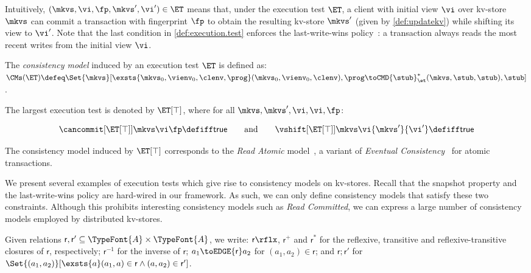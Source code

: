 Intuitively, \((\mkvs, \vi, \fp, \mkvs', \vi') \in \ET\) means that, under the execution test \(\ET\),
a client with initial view \(\vi\) over kv-store \(\mkvs\) can commit a transaction with 
fingerprint \(\fp\) to obtain the resulting kv-store \(\mkvs'\) (given
by \cref{def:updatekv}) while shifting its view
to \(\vi'\). 
Note that the last condition in \cref{def:execution.test} enforces the last-write-wins
policy~\cite{vogels:2009:ec:1435417.1435432}: 
a transaction always reads the most recent writes from the initial view \(\vi\).  

\SpaceAboveDef
\begin{definition}
\label{def:cm}
The \emph{consistency model} induced by an execution test \(\ET\) is defined as: 
\(
\CMs(\ET) \defeq 
\Set{\mkvs}[ 
\exsts{\mkvs_0,\vienv_0,\clenv,\prog}
(\mkvs_0,\vienv_0,\clenv),\prog \toCMD{\stub}_{\et}^{*} (\mkvs, \stub, \stub),\stub
]
\).
\end{definition}
\SpaceBelowDef

The largest execution test is denoted by \(\ET[\top]\), where for all \(\mkvs, \mkvs', \vi, \vi, \fp\):%

\SpaceAboveMath
\[
	\cancommit[{\ET[\top]}] \mkvs \vi \fp \defiff \mathsf{true}
	\qquad  \text{and} \qquad 
	\vshift[{\ET[\top]}] \mkvs \vi {\mkvs'} {\vi'} \defiff \mathsf{true}
\]%
\SpaceBelowMath

The consistency model induced by \(\ET[\top]\) 
corresponds to the \emph{Read Atomic} model~\cite{ramp}, a variant of \emph{Eventual 
Consistency}~\cite{ev_transactions} for atomic transactions. 

\label{subsec:cm_examples}
We present several examples of execution tests which give rise to consistency models on kv-stores.
Recall that the snapshot property and the last-write-wins policy are hard-wired in our framework. 
As such, we can only define consistency models that satisfy these two constraints. 
Although this prohibits interesting consistency models such as \emph{Read Committed},
we can express a large number of consistency models employed by distributed kv-stores.

Given relations \(\mathsf r, \mathsf r' \subseteq \TypeFont{A} \times \TypeFont{A}\),
we write: \(\mathsf r\rflx\), \(\mathsf r^+\) and \(\mathsf r^*\) for the reflexive, transitive and reflexive-transitive closures of \(\mathsf r\), respectively;
\(\mathsf r^{-1}\) for the inverse of $\mathsf r$;
\(a_1 \toEDGE{\mathsf r} a_2\) for \((a_1, a_2) \in \mathsf r\);
and \( \mathsf r; \mathsf r'\) for \( \Set{(a_1,a_2)}[\exsts{a} (a_1,a) \in \mathsf r\land (a,a_2) \in \mathsf r']\).

